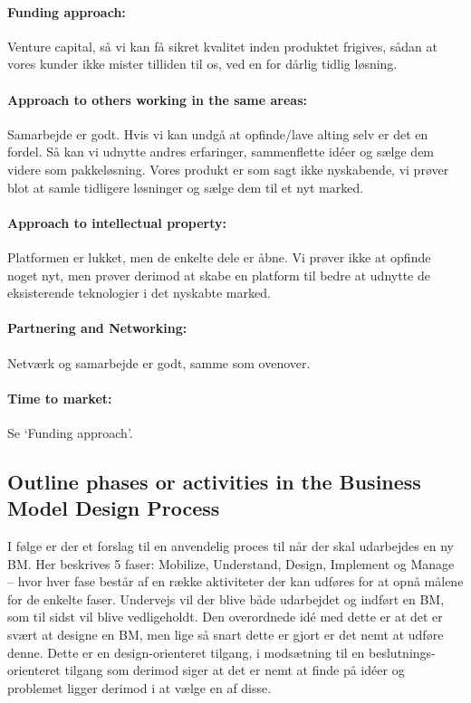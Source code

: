 \paragraph{Funding approach:} Venture capital, så vi kan få sikret kvalitet inden produktet frigives, sådan at vores kunder ikke mister tilliden til os, ved en for dårlig tidlig løsning.

\paragraph{Approach to others working in the same areas:} Samarbejde er godt.
Hvis vi kan undgå at opfinde/lave alting selv er det en fordel.
Så kan vi udnytte andres erfaringer, sammenflette idéer og sælge dem videre som pakkeløsning.
Vores produkt er som sagt ikke nyskabende, vi prøver blot at samle tidligere løsninger og sælge dem til et nyt marked.

\paragraph{Approach to intellectual property:} Platformen er lukket, men de enkelte dele er åbne.
Vi prøver ikke at opfinde noget nyt, men prøver derimod at skabe en platform til bedre at udnytte de eksisterende teknologier i det nyskabte marked.

\paragraph{Partnering and Networking:} Netværk og samarbejde er godt, samme som ovenover.

\paragraph{Time to market:} Se `Funding approach'.

\subsection{Outline phases or activities in the Business Model Design Process}
I følge \citet[pp. 244-259]{osterwalder2009business} er der et forslag til en anvendelig proces til når der skal udarbejdes en ny BM.
Her beskrives 5 faser: Mobilize, Understand, Design, Implement og Manage -- hvor hver fase består af en række aktiviteter der kan udføres for at opnå målene for de enkelte faser.
Undervejs vil der blive både udarbejdet og indført en BM, som til sidst vil blive vedligeholdt.
Den overordnede idé med dette er at det er svært at designe en BM, men lige så snart dette er gjort er det nemt at udføre denne.
Dette er en design-orienteret tilgang, i modsætning til en beslutnings-orienteret tilgang som derimod siger at det er nemt at finde på idéer og problemet ligger derimod i at vælge en af disse.

